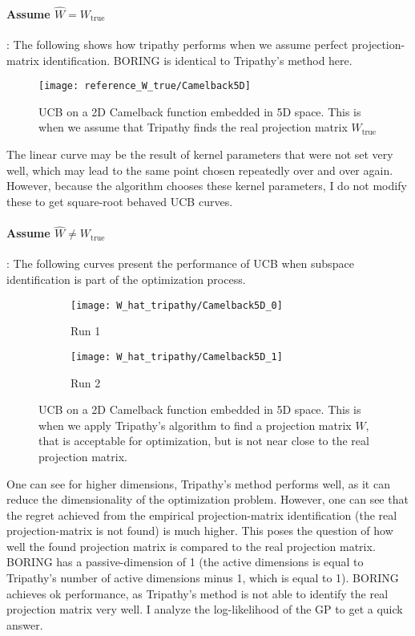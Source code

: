 \paragraph{Assume $\hat{W} = W_{\text{true}}$}: The following shows how tripathy performs when we assume perfect projection-matrix identification.
BORING is identical to  Tripathy's method here.

\begin{figure}[H]
  \centering
      \texttt{[image: reference\_W\_true/Camelback5D]}
  \caption{UCB on a 2D Camelback function embedded in 5D space.
  This is when we assume that Tripathy finds the real projection matrix $W_{\text{true}}$}
\end{figure}

The linear curve may be the result of kernel parameters that were not set very well, which may lead to the same point chosen repeatedly over and over again.
However, because the algorithm chooses these kernel parameters, I do not modify these to get square-root behaved UCB curves.

\paragraph{Assume $\hat{W} \neq W_{\text{true}}$}: The following curves present the performance of UCB when subspace identification is part of the optimization process.

\begin{figure}[H]
    \centering
    \begin{subfigure}[b]{0.40\textwidth}
        \texttt{[image: W\_hat\_tripathy/Camelback5D\_0]}
        \label{fig:gull}
        \caption{Run 1}
    \end{subfigure}
    \begin{subfigure}[b]{0.40\textwidth}
        \texttt{[image: W\_hat\_tripathy/Camelback5D\_1]}
        \label{fig:tiger}
        \caption{Run 2}
    \end{subfigure}   
           \caption{UCB on a 2D Camelback function embedded in 5D space.
  This is when we apply Tripathy's algorithm to find a projection matrix $W$, that is acceptable for optimization, but is not near close to the real projection matrix.}
\end{figure}

One can see for higher dimensions, Tripathy's method performs well, as it can reduce the dimensionality of the optimization problem.
However, one can see that the regret achieved from the empirical projection-matrix identification (the real projection-matrix is not found) is much higher.
This poses the question of how well the found projection matrix is compared to the real projection matrix.
BORING has a passive-dimension of 1 (the active dimensions is equal to Tripathy's number of active dimensions minus 1, which is equal to 1).
BORING achieves ok performance, as Tripathy's method is not able to identify the real projection matrix very well. 
I analyze the log-likelihood of the GP to get a quick answer. \\


